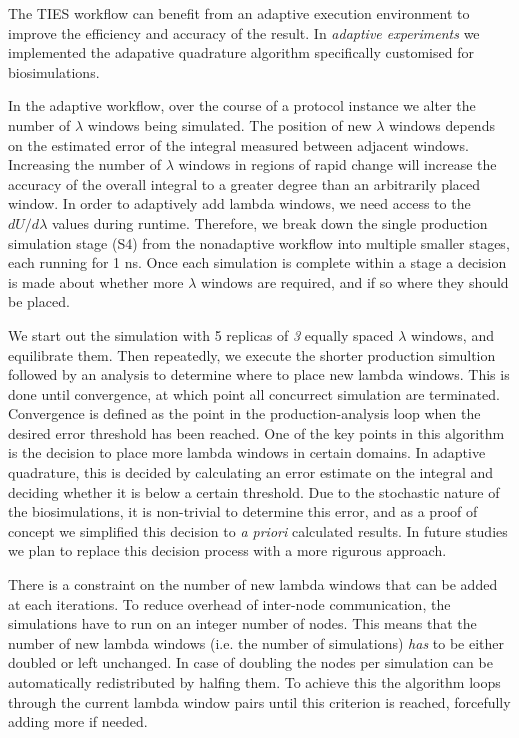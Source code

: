 The TIES workflow can benefit from an adaptive execution environment to improve
the efficiency and accuracy of the result. In \emph{adaptive experiments} we
implemented the adapative quadrature algorithm specifically customised for
biosimulations.

In the adaptive workflow, over the course of a protocol instance we alter
the number of $\lambda$ windows being simulated. The position of new $\lambda$
windows depends on the estimated error of the integral measured between
adjacent windows. Increasing the number of $\lambda$ windows in regions of
rapid change will increase the accuracy of the overall integral to a greater
degree than an
arbitrarily placed window. In order to adaptively add lambda windows, we need
access to the $dU/d\lambda$ values during runtime. Therefore, we break down the
single production simulation stage (S4) from the nonadaptive workflow into
multiple smaller stages, each running for 1 ns. Once each simulation is
complete within a stage a decision is made about whether more $\lambda$ windows
are required, and if so where they should be placed.

We start out the simulation with 5 replicas of \emph{3} equally spaced
$\lambda$ windows, and equilibrate them. Then repeatedly, we execute the
shorter production simultion followed by an analysis to determine where to
place new lambda windows. This is done until convergence, at which point all
concurrect simulation are terminated. Convergence is defined as the point in
the production-analysis loop when the desired error threshold has been
reached.  One of the key points in this algorithm is the decision to place more
lambda windows in certain domains. In adaptive quadrature, this is decided by
calculating an error estimate on the integral and deciding whether it is below
a certain threshold. Due to the stochastic nature of the biosimulations, it is
non-trivial to determine this error, and as a proof of concept we simplified
this decision to {\it a priori} calculated results. In future studies we plan
to replace this decision process with a more rigurous approach.

There is a constraint on the number of new lambda windows that can be added at
each iterations. To reduce overhead of inter-node communication, the
simulations have to run on an integer number of nodes. This means that the
number of new lambda windows (i.e. the number of simulations) \emph{has} to be
either doubled or left unchanged. In case of doubling the nodes per simulation can be automatically redistributed by halfing them. To achieve this the algorithm loops through the current lambda window pairs until this criterion is reached, forcefully adding more if needed.


